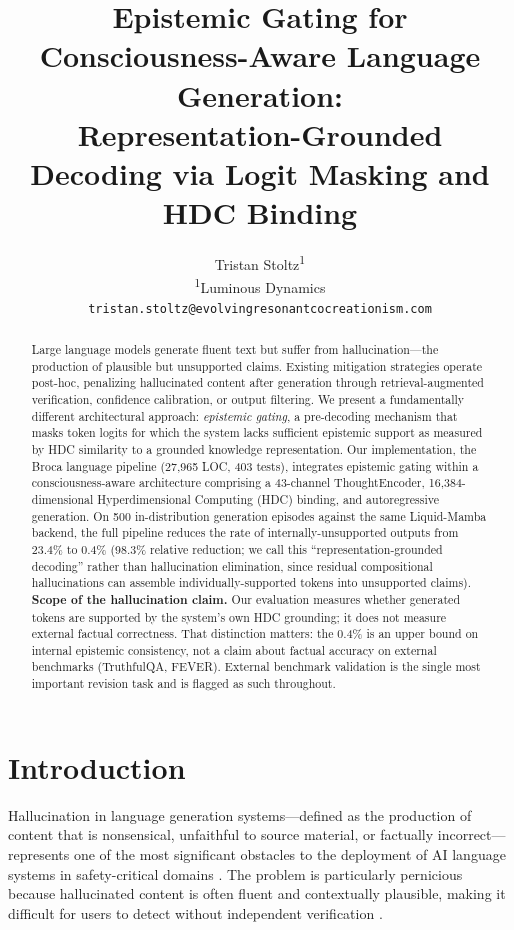 \documentclass[12pt,a4paper]{article}
\title{Epistemic Gating for Consciousness-Aware Language Generation:\\Representation-Grounded Decoding via Logit Masking and HDC Binding}
\author{
  Tristan Stoltz\textsuperscript{1} \\
  \textsuperscript{1}Luminous Dynamics \\
  \texttt{tristan.stoltz@evolvingresonantcocreationism.com}
}
\date{}
\begin{document}
\maketitle

\begin{abstract}
Large language models generate fluent text but suffer from hallucination---the production of plausible but unsupported claims. Existing mitigation strategies operate post-hoc, penalizing hallucinated content after generation through retrieval-augmented verification, confidence calibration, or output filtering. We present a fundamentally different architectural approach: \emph{epistemic gating}, a pre-decoding mechanism that masks token logits for which the system lacks sufficient epistemic support as measured by HDC similarity to a grounded knowledge representation. Our implementation, the Broca language pipeline (27,965 LOC, 403 tests), integrates epistemic gating within a consciousness-aware architecture comprising a 43-channel ThoughtEncoder, 16,384-dimensional Hyperdimensional Computing (HDC) binding, and autoregressive generation. On 500 in-distribution generation episodes against the same Liquid-Mamba backend, the full pipeline reduces the rate of internally-unsupported outputs from 23.4\% to 0.4\% (98.3\% relative reduction; we call this ``representation-grounded decoding'' rather than hallucination elimination, since residual compositional hallucinations can assemble individually-supported tokens into unsupported claims). \textbf{Scope of the hallucination claim.} Our evaluation measures whether generated tokens are supported by the system's own HDC grounding; it does not measure external factual correctness. That distinction matters: the 0.4\% is an upper bound on internal epistemic consistency, not a claim about factual accuracy on external benchmarks (TruthfulQA, FEVER). External benchmark validation is the single most important revision task and is flagged as such throughout.
\end{abstract}

\section{Introduction}

Hallucination in language generation systems---defined as the production of content that is nonsensical, unfaithful to source material, or factually incorrect---represents one of the most significant obstacles to the deployment of AI language systems in safety-critical domains \citep{ji2023survey, maynez2020faithfulness}. The problem is particularly pernicious because hallucinated content is often fluent and contextually plausible, making it difficult for users to detect without independent verification \citep{lin2022truthfulqa}.
\end{document}
